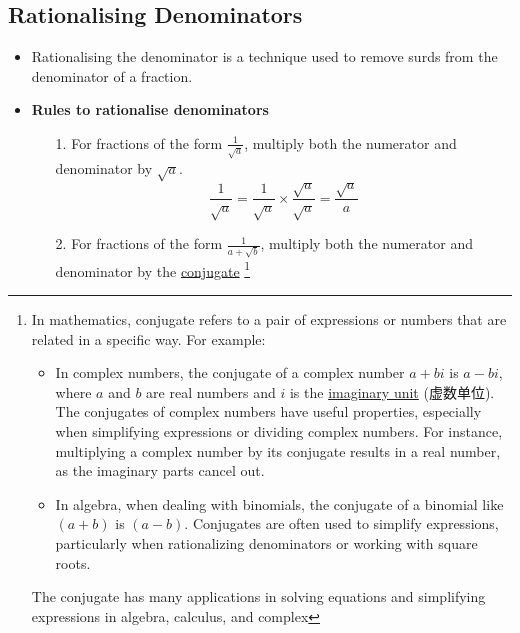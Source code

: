 
\subsection{Rationalising Denominators}
\begin{itemize}
    \item Rationalising the denominator is a technique used to remove surds from the denominator of a fraction.
    \item \textbf{Rules to rationalise denominators}
    \begin{itemize}
        \item[1.] For fractions of the form $\frac{1}{\sqrt{a}}$, multiply both the numerator and denominator by $\sqrt{a}$.
        \begin{equation}
            \frac{1}{\sqrt{a}} = \frac{1}{\sqrt{a}} \times \frac{\sqrt{a}}{\sqrt{a}} = \frac{\sqrt{a}}{a}
        \end{equation}
        \item[2.] For fractions of the form $\frac{1}{a + \sqrt{b}}$, multiply both the numerator and denominator by the
        \underline{conjugate} \footnote{In mathematics, conjugate refers to a pair of expressions or numbers that are related in
        a specific way. For example:
        \begin{itemize}
            \item In complex numbers, the conjugate of a complex number $a + bi$ is $a - bi$, where $a$ and $b$ are real numbers
            and $i$ is the \underline{imaginary unit} \footnotemark (虚数单位). The conjugates of complex numbers have useful
            properties, especially when simplifying expressions or dividing complex numbers. For instance, multiplying a complex
            number by its conjugate results in a real number, as the imaginary parts cancel out.
            \item In algebra, when dealing with binomials, the conjugate of a binomial like $\left(a + b\right)$ is
            $\left(a - b\right)$. Conjugates are often used to simplify expressions, particularly when rationalizing denominators
            or working with square roots.
        \end{itemize}
        The conjugate has many applications in solving equations and simplifying expressions in algebra, calculus, and complex
}
\end{itemize}
\end{itemize}
